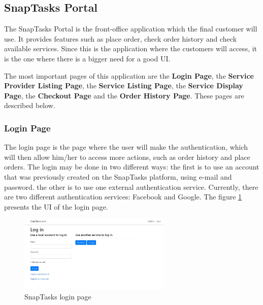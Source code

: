 \subsection{SnapTasks Portal}
\label{sub:UI_SnaptasksPortal}
The SnapTasks Portal is the front-office application which the final customer will use. It provides features such as place order, check order history and check available services. Since this is the application where the customers will access, it is the one where there is a bigger need for a good \gls{UI}. 

\par

The most important pages of this application are the \textbf{Login Page}, the \textbf{Service Provider Listing Page}, the \textbf{Service Listing Page}, the \textbf{Service Display Page}, the \textbf{Checkout Page} and the \textbf{Order History Page}. These pages are described below.

\clearpage
\subsubsection{Login Page}

The login page is the page where the user will make the authentication, which will then allow him/her to access more actions, such as order history and place orders. The login may be done in two different ways: the first is to use an account that was previously created on the SnapTasks platform, using e-mail and password. the other is to use one external authentication service. Currently, there are two different authentication services: Facebook and Google. The figure \ref{fig:snaptasksLogin} presents the \gls{UI} of the login page.

\begin{figure}[ht]
\centering
\includegraphics[width=0.65\textwidth,keepaspectratio]{chapters/Implementation/assets/snaptasks-login.jpg}
\caption[SnapTasks login page]{SnapTasks login page}
\label{fig:snaptasksLogin}
\end{figure}


